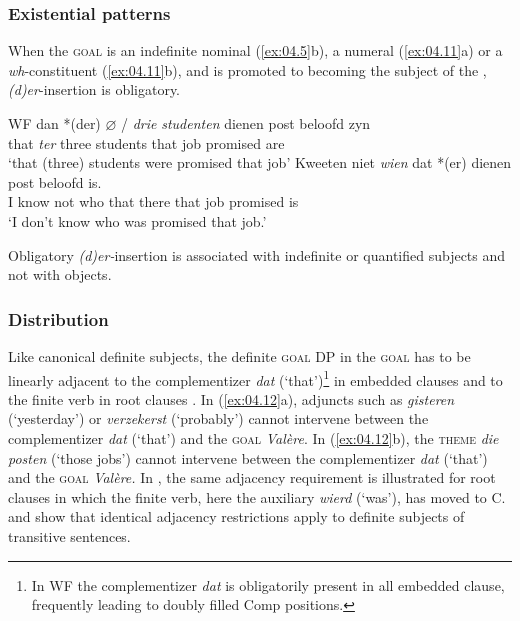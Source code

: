 \documentclass[output=paper]{langsci/langscibook}
\begin{document}
\subsubsection{Existential patterns}\largerpage[1]

When the \textsc{goal} is an indefinite nominal (\ref{ex:04.5}b), a numeral
(\ref{ex:04.11}a) or a \emph{wh}{}-constituent (\ref{ex:04.11}b), and is promoted
to becoming the subject of the ,  \emph{(d)er}{}-insertion is
obligatory.

\ea\label{ex:04.11}\glsdesc{WF}
    \ea
	\gll   dan *(der) $\varnothing$ / \textit{drie} \textit{studenten}   dienen post   beloofd zyn\\
    that \hphantom{*}\emph{ter} {} {} three students   that job   promised are\\
	\glt     ‘that (three) students were promised that job’
    \ex
	\gll   Kweeten   niet   \textit{wien}   dat *(er)   dienen post   beloofd   is.\\
    {I know}  not   who   that \hphantom{*(}there   that job   promised   is\\
	\glt     ‘I don’t know who was promised that job.’
    \z
\z

Obligatory \emph{(d)er-}insertion is associated with indefinite or quantified
subjects and not with objects.

\subsubsection{Distribution}\largerpage[-1]

Like canonical definite subjects, the definite \textsc{goal} DP in the
\textsc{goal}  has to be linearly adjacent to the complementizer
\emph{dat} (‘that’)\footnote{In \gls{WF} the complementizer
    \emph{dat} is obligatorily present in all embedded clause, frequently
leading to doubly filled Comp positions.} in embedded clauses
 and to the finite verb in root clauses .
In (\ref{ex:04.12}a), adjuncts such as \emph{gisteren} (‘yesterday’) or
\emph{verzekerst} (‘probably’) cannot intervene between the complementizer
\emph{dat} (‘that’) and the \textsc{goal} \emph{Valère}. In
(\ref{ex:04.12}b), the \textsc{theme} \emph{die posten} (‘those jobs’)
cannot intervene between the complementizer \emph{dat} (‘that’) and the
\textsc{goal} \emph{Valère.} In , the same adjacency
requirement is illustrated for root clauses in which the finite verb, here the
auxiliary \emph{wierd} (‘was’), has moved to C.   and
 show that identical adjacency restrictions apply to definite
subjects of transitive sentences.
\end{document}
